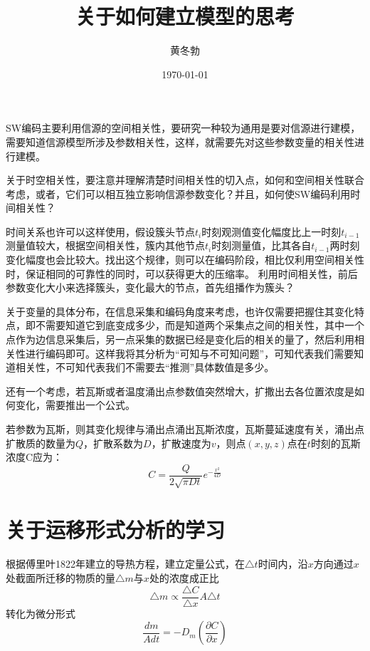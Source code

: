 \documentclass[UTF8]{ctexart}
\title{\heiti 关于如何建立模型的思考}
\author{\kaishu 黄冬勃}
\date{\today}
\theoremstyle{plain}
\begin{document}
\maketitle
\tableofcontents

\cite{Ali2007}
SW编码主要利用信源的空间相关性，要研究一种较为通用是要对信源进行建模，需要知道信源模型所涉及参数相关性，这样，就需要先对这些参数变量的相关性进行建模。

关于时空相关性，要注意并理解清楚时间相关性的切入点，如何和空间相关性联合考虑，或者，它们可以相互独立影响信源参数变化？并且，如何使SW编码利用时间相关性？ 


时间关系也许可以这样使用，假设簇头节点$t_i$时刻观测值变化幅度比上一时刻$t_{i-1}$测量值较大，根据空间相关性，簇内其他节点$t_i$时刻测量值，比其各自$t_{i-1}$两时刻变化幅度也会比较大。找出这个规律，则可以在编码阶段，相比仅利用空间相关性时，保证相同的可靠性的同时，可以获得更大的压缩率。
利用时间相关性，前后参数变化大小来选择簇头，变化最大的节点，首先组播作为簇头？

关于变量的具体分布，在信息采集和编码角度来考虑，也许仅需要把握住其变化特点，即不需要知道它到底变成多少，而是知道两个采集点之间的相关性，其中一个点作为边信息采集后，另一点采集的数据已经是变化后的相关的量了，然后利用相关性进行编码即可。这样我将其分析为``可知与不可知问题''，可知代表我们需要知道相关性，不可知代表我们不需要去``推测''具体数值是多少。

还有一个考虑，若瓦斯或者温度涌出点参数值突然增大，扩撒出去各位置浓度是如何变化，需要推出一个公式。

若参数为瓦斯，则其变化规律与涌出点涌出瓦斯浓度，瓦斯蔓延速度有关，涌出点扩散质的数量为$Q$，扩散系数为$D$，扩散速度为$v$，则点$(x,y,z)$点在$t$时刻的瓦斯浓度C应为：
\begin{equation*}
    C=\dfrac{Q}{2\sqrt{\pi D t}}e^{-\frac{x^2}{4D}}
\end{equation*}

\section{关于运移形式分析的学习}
根据傅里叶1822年建立的导热方程，建立定量公式，在$\triangle t$时间内，沿$x$方向通过$x$处截面所迁移的物质的量$\triangle m$与$x$处的浓度\textcolor[rgb]{1,0,0}{成正比}
\begin{equation*}
    \triangle m \propto \dfrac{\triangle C}{\triangle x} A \triangle t
\end{equation*}
转化为微分形式
\begin{equation*}
    \dfrac{dm}{Adt} = - D_m\left(\dfrac{\partial C}{\partial x}\right)
\end{equation*}
\end{document}
